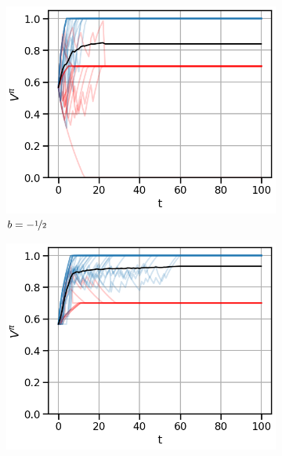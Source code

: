 \begin{figure}[!ht]
\centering
  \begin{subfigure}[b]{0.326\linewidth}
    \includegraphics[width=\textwidth]{articles/baselines/figs/appendix_figs_3arm_000/vanilla_fixed_-05_eta=01.png}
    \caption{$b = - \nicefrac{1}{2}$}
  \end{subfigure}
    \begin{subfigure}[b]{0.326\linewidth}
    \includegraphics[width=\textwidth]{articles/baselines/figs/appendix_figs_3arm_000/vanilla_fixed_00_eta=01.png}

\end{subfigure}
\end{figure}
